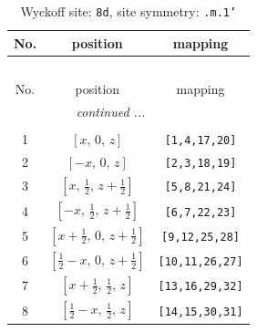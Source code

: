 \documentclass[fleqn,8pt]{jsarticle}
\begin{document}
\begin{longtable}{ccc}
\caption{Wyckoff site: {\tt 8d}, site symmetry: {\tt .m.1'}}
 \\
 \hline \hline
No. & position & mapping \\ \hline \endfirsthead

\multicolumn{2}{l}{\tablename\ \thetable{}} \\
 \hline \hline
No. & position & mapping \\ \hline \endhead

 \hline \hline
\multicolumn{2}{r}{\footnotesize\it continued ...} \\ \endfoot

 \hline \hline
\multicolumn{2}{r}{} \\ \endlastfoot

1 & $\left[ x,\, 0,\, z \right]$ & {\tt [1,4,17,20]} \\ \hline
2 & $\left[ - x,\, 0,\, z \right]$ & {\tt [2,3,18,19]} \\ \hline
3 & $\left[ x,\, \frac{1}{2},\, z + \frac{1}{2} \right]$ & {\tt [5,8,21,24]} \\ \hline
4 & $\left[ - x,\, \frac{1}{2},\, z + \frac{1}{2} \right]$ & {\tt [6,7,22,23]} \\ \hline
5 & $\left[ x + \frac{1}{2},\, 0,\, z + \frac{1}{2} \right]$ & {\tt [9,12,25,28]} \\ \hline
6 & $\left[ \frac{1}{2} - x,\, 0,\, z + \frac{1}{2} \right]$ & {\tt [10,11,26,27]} \\ \hline
7 & $\left[ x + \frac{1}{2},\, \frac{1}{2},\, z \right]$ & {\tt [13,16,29,32]} \\ \hline
8 & $\left[ \frac{1}{2} - x,\, \frac{1}{2},\, z \right]$ & {\tt [14,15,30,31]} \\
\end{longtable}
\renewcommand{\arraystretch}{1.2}
\end{document}
